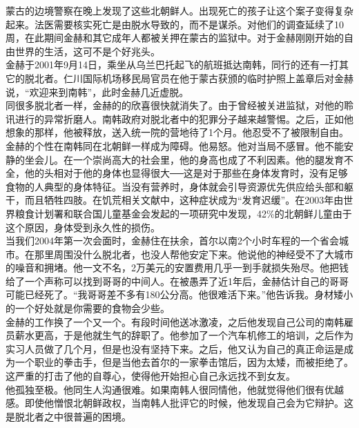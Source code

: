 蒙古的边境警察在晚上发现了这些北朝鲜人。出现死亡的孩子让这个案子变得复杂起来。法医需要核实死亡是由脱水导致的，而不是谋杀。对他们的调查延续了10周，在此期间金赫和其它成年人都被关押在蒙古的监狱中。对于金赫刚刚开始的自由世界的生活，这可不是个好兆头。\\

金赫于2001年9月14日，乘坐从乌兰巴托起飞的航班抵达南韩，同行的还有一打其它的脱北者。仁川国际机场移民局官员在他于蒙古获颁的临时护照上盖章后对金赫说，“欢迎来到南韩”，此时金赫几近虚脱。\\

同很多脱北者一样，金赫的的欣喜很快就消失了。由于曾经被关进监狱，对他的聆讯进行的异常折磨人。南韩政府对脱北者中的犯罪分子越来越警惕。之后，正如他想象的那样，他被释放，送入统一院的营地待了1个月。他忍受不了被限制自由。\\

金赫的个性在南韩同在北朝鲜一样成为障碍。他易怒。他对当局不感冒。他不能安静的坐会儿。在一个崇尚高大的社会里，他的身高也成了不利因素。他的腿发育不全，他的头相对于他的身体也显得很大──这是对于那些在身体发育时，没有足够食物的人典型的身体特征。当没有营养时，身体就会引导资源优先供应给头部和躯干，而且牺牲四肢。在饥荒相关文献中，这种症状成为“发育迟缓”。在2003年由世界粮食计划署和联合国儿童基金会发起的一项研究中发现，42\%的北朝鲜儿童由于这个原因，身体受到永久性的损伤。\\

当我们2004年第一次会面时，金赫住在扶余，首尔以南2个小时车程的一个省会城市。在那里周围没什么脱北者，也没人帮他安定下来。他说他的神经受不了大城市的噪音和拥堵。他一文不名，2万美元的安置费用几乎一到手就损失殆尽。他把钱给了一个声称可以找到哥哥的中间人。在被愚弄了近1年后，金赫估计自己的哥哥可能已经死了。“我哥哥差不多有180公分高。他很难活下来。”他告诉我。身材矮小的一个好处就是你需要的食物会少些。\\

金赫的工作换了一个又一个。有段时间他送冰激凌，之后他发现自己公司的南韩雇员薪水更高，于是他就生气的辞职了。他参加了一个汽车机修工的培训，之后作为实习人员做了几个月，但是也没有坚持下来。之后，他又认为自己的真正命运是成为一个职业的拳击手，但是当他去首尔的一家拳击馆后，因为太矮，而被拒绝了。这严重的打击了他的自尊心，使得他开始担心自己永远找不到女友。\\

他孤独至极。他同生人沟通很难。如果南韩人很同情他，他就觉得他们很有优越感。即使他憎恨北朝鲜政权，当南韩人批评它的时候，他发现自己会为它辩护。这是脱北者之中很普遍的困境。\\

